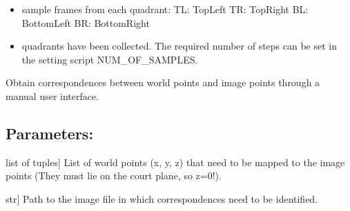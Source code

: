 \documentclass[letterpaper,10pt,english]{sphinxmanual}
\begin{document}
\begin{fulllineitems}
\begin{fulllineitems}
\begin{itemize}
\item {} \begin{description}
\sphinxAtStartPar
sample frames from each quadrant:
\sphinxhyphen{} TL: Top\sphinxhyphen{}Left
\sphinxhyphen{} TR: Top\sphinxhyphen{}Right
\sphinxhyphen{} BL: Bottom\sphinxhyphen{}Left
\sphinxhyphen{} BR: Bottom\sphinxhyphen{}Right

\end{description}

\item {} \begin{description}
\sphinxAtStartPar
quadrants have been collected. The required number of steps can be
set in the setting script NUM\_OF\_SAMPLES.

\end{description}

\end{itemize}

\end{fulllineitems}


\begin{fulllineitems}
\label{\detokenize{CameraUtils:id10}}
\pysigstartsignatures
{}
\pysigstopsignatures
\sphinxAtStartPar
Obtain correspondences between world points and image points through a manual user interface.


\subsection{Parameters:}
\label{\detokenize{CameraUtils:parameters}}\begin{description}
\sphinxlineitem{world\_points}{[}list of tuples{]}
\sphinxAtStartPar
List of world points (x, y, z) that need to be mapped to the image points (They must lie on the court plane, so z=0!).

\sphinxlineitem{image\_path}{[}str{]}
\sphinxAtStartPar
Path to the image file in which correspondences need to be identified.

\end{description}



\end{fulllineitems}
\end{fulllineitems}
\end{document}
